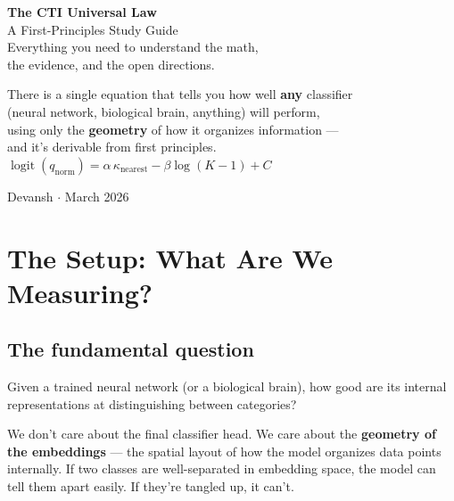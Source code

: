 \documentclass[11pt,a4paper]{article}
\DeclareMathOperator{\logit}{logit}
\begin{document}
\begin{titlepage}
\centering
\vspace*{2cm}
{\Huge\bfseries\color{ctiblue} The CTI Universal Law}\\[0.8cm]
{\LARGE\color{ctiorange} A First-Principles Study Guide}\\[1.5cm]
{\large Everything you need to understand the math,\\the evidence, and the open directions.}\\[3cm]

\begin{tcolorbox}[colback=lightblue, colframe=ctiblue, width=0.85\textwidth, sharp corners]
\centering\large
There is a single equation that tells you how well \textbf{any} classifier\\
(neural network, biological brain, anything) will perform,\\
using only the \textbf{geometry} of how it organizes information ---\\
and it's derivable from first principles.\\[0.5cm]
\Large\bfseries\color{ctiblue}
$\displaystyle\logit(q_{\mathrm{norm}}) = \alpha\,\kappa_{\mathrm{nearest}} - \beta\log(K{-}1) + C$
\end{tcolorbox}

\vfill
{\large Devansh $\cdot$ March 2026}
\end{titlepage}

\tableofcontents
\newpage

\section{The Setup: What Are We Measuring?}

\subsection{The fundamental question}

Given a trained neural network (or a biological brain), how good are its internal representations at distinguishing between categories?

We don't care about the final classifier head. We care about the \textbf{geometry of the embeddings} --- the spatial layout of how the model organizes data points internally. If two classes are well-separated in embedding space, the model can tell them apart easily. If they're tangled up, it can't.
\end{document}
